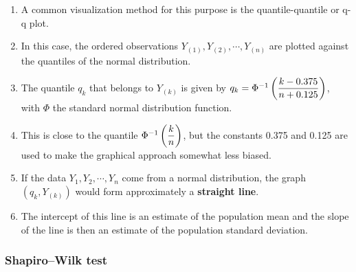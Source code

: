 \begin{enumerate}
    \item A common visualization method for this purpose is the quantile-quantile or q-q plot. 
    \hfill \cite{statistics/book/Statistics-for-Data-Scientists/Maurits-Kaptein}

    \item In this case, the ordered observations $Y_{(1)}, Y_{(2)} , \cdots , Y_{(n)}$ are plotted against the quantiles of the normal distribution.
    \hfill \cite{statistics/book/Statistics-for-Data-Scientists/Maurits-Kaptein}

    \item The quantile $q _k$ that belongs to $Y_{(k)}$ is given by $q_k = \Phi^{-1}\left(\dfrac{k - 0.375}{n + 0.125}\right)$, with $\Phi$ the standard normal distribution function. 
    \hfill \cite{statistics/book/Statistics-for-Data-Scientists/Maurits-Kaptein}

    \item This is close to the quantile $\Phi^{-1}\left(\dfrac{ k}{n}\right)$, but the constants 0.375 and 0.125 are used to make the graphical approach somewhat less biased.
    \hfill \cite{statistics/book/Statistics-for-Data-Scientists/Maurits-Kaptein}

    \item  If the data $Y_1 , Y_2, \cdots , Y_n$ come from a normal distribution, the graph $(q_k , Y_{(k)} )$ would form approximately a \textbf{straight line}.
    \hfill \cite{statistics/book/Statistics-for-Data-Scientists/Maurits-Kaptein}

    \item The intercept of this line is an estimate of the population mean and the slope of the line is then an estimate of the population standard deviation.
    \hfill \cite{statistics/book/Statistics-for-Data-Scientists/Maurits-Kaptein}
\end{enumerate}

\subsubsection{Shapiro–Wilk test}

